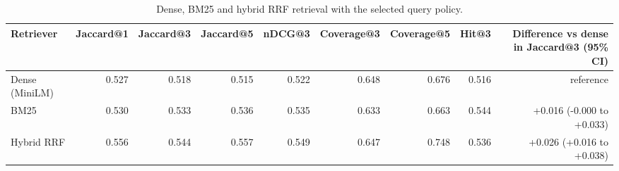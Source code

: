 \begin{table}[t]
\centering
\scriptsize
\begin{tabular}{lrrrrrrrr}
\hline
Retriever & Jaccard@1 & Jaccard@3 & Jaccard@5 & nDCG@3 & Coverage@3 & Coverage@5 & Hit@3 & Difference vs dense in Jaccard@3 (95\% CI) \\
\hline
Dense (MiniLM) & 0.527 & 0.518 & 0.515 & 0.522 & 0.648 & 0.676 & 0.516 & reference \\
BM25 & 0.530 & 0.533 & 0.536 & 0.535 & 0.633 & 0.663 & 0.544 & +0.016 (-0.000 to +0.033) \\
Hybrid RRF & 0.556 & 0.544 & 0.557 & 0.549 & 0.647 & 0.748 & 0.536 & +0.026 (+0.016 to +0.038) \\
\hline
\end{tabular}
\caption{Dense, BM25 and hybrid RRF retrieval with the selected query policy.}
\label{tab:table2_retriever_comparison}
\end{table}
